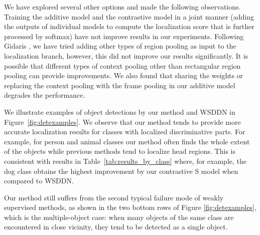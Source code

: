 \documentclass[runningheads]{llncs}
\begin{document}
We have explored several other options and made the following observations.
Training the additive model and the contrastive model in a joint manner (adding the outputs of individual models to compute the localization score that is further processed by softmax) have not improve results in our experiments.
Following Gidaris \etal\cite{Gidaris_2015_ICCV}, we have tried adding other types of region pooling as input to the localization branch, however, this did not improve our results significantly. It is possible that different types of context pooling other than rectangular region pooling can provide improvements. We also found that sharing the weights or replacing the context pooling with the frame pooling in our additive model degrades the performance.

We illustrate examples of object detections by our method and WSDDN in Figure~\ref{fig:detexamples}.
We observe that our method tends to provide more accurate localization results for 
classes with localized discriminative parts. For example, for person and animal classes our method often finds
the whole extent of the objects while previous methods tend to localize head regions.
This is consistent with results in Table~\ref{tab:results_by_class} where, for example, the dog class obtains the highest improvement by our contrastive S model when compared to WSDDN. 

Our method still suffers from the second typical failure mode of weakly supervised 
methods, as shown in the two bottom rows of Figure \ref{fig:detexamples}, which is the 
multiple-object case: when many objects of the same class are encountered in close 
vicinity, they tend to be detected as a single object.
\end{document}
